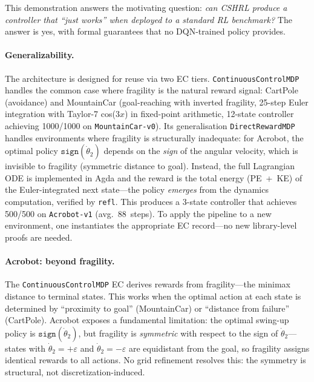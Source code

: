 \documentclass[9pt,a4paper]{article}
\theoremstyle{plain}
\theoremstyle{definition}
\theoremstyle{remark}
\begin{document}
This demonstration answers the motivating question: \emph{can CSHRL produce a controller that ``just works'' when deployed to a standard RL benchmark?}  The answer is yes, with formal guarantees that no DQN-trained policy provides.

\paragraph{Generalizability.}
The architecture is designed for reuse via two EC tiers.  \texttt{ContinuousControlMDP} handles the common case where fragility is the natural reward signal: CartPole (avoidance) and MountainCar (goal-reaching with inverted fragility, 25-step Euler integration with Taylor-7 cos($3x$) in fixed-point arithmetic, 12-state controller achieving 1000/1000 on \texttt{MountainCar-v0}).  Its generalisation \texttt{DirectRewardMDP} handles environments where fragility is structurally inadequate: for Acrobot, the optimal policy $\texttt{sign}(\dot\theta_2)$ depends on the \emph{sign} of the angular velocity, which is invisible to fragility (symmetric distance to goal).  Instead, the full Lagrangian ODE is implemented in Agda and the reward is the total energy (PE~+~KE) of the Euler-integrated next state---the policy \emph{emerges} from the dynamics computation, verified by \texttt{refl}.  This produces a 3-state controller that achieves 500/500 on \texttt{Acrobot-v1} (avg.\ 88~steps).  To apply the pipeline to a new environment, one instantiates the appropriate EC record---no new library-level proofs are needed.

\paragraph{Acrobot: beyond fragility.}
The \texttt{ContinuousControlMDP} EC derives rewards from fragility---the minimax distance to terminal states.  This works when the optimal action at each state is determined by ``proximity to goal'' (MountainCar) or ``distance from failure'' (CartPole).  Acrobot exposes a fundamental limitation: the optimal swing-up policy is $\texttt{sign}(\dot\theta_2)$, but fragility is \emph{symmetric} with respect to the sign of $\dot\theta_2$---states with $\dot\theta_2 = +\varepsilon$ and $\dot\theta_2 = -\varepsilon$ are equidistant from the goal, so fragility assigns identical rewards to all actions.  No grid refinement resolves this: the symmetry is structural, not discretization-induced.
\end{document}
